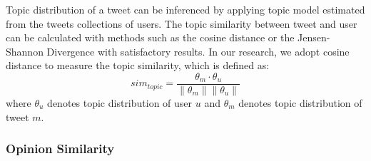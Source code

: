 \documentclass[letterpaper]{article}
\begin{document}
Topic distribution of a tweet can be inferenced by applying topic model estimated from the tweets collections of users.
The topic similarity between tweet and user can be calculated with methods such as the cosine distance \cite{cha2007comprehensive} or the Jensen-Shannon Divergence \cite{weng2010twitterrank} with satisfactory results.
In our research, we adopt cosine distance to measure the topic similarity, which is defined as:
\begin{equation}
sim_{topic}=\dfrac{\theta_{m} \cdot \theta_{u}}{\parallel \theta_{m} \parallel \parallel \theta_{u} \parallel}
\end{equation}
where $ \theta_{u}$ denotes topic distribution of user $ u $ and $\theta_{m}$ denotes topic distribution of tweet $ m $. 

\subsubsection{Opinion Similarity}
\label{opsim}
\end{document}
